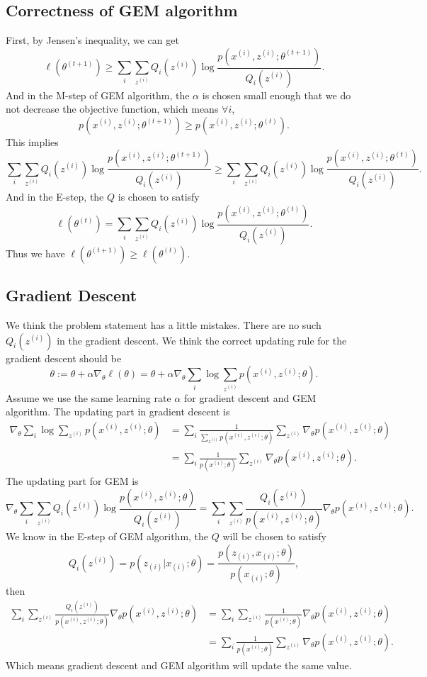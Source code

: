 \documentclass{article}
\begin{document}
\subsection{Correctness of GEM algorithm}
First, by Jensen's inequality, we can get $$\ell(\theta^{(t+1)})\ge\sum_i\sum_{z^{(i)}}Q_i(z^{(i)})\log \frac{p(x^{(i)},z^{(i)};\theta^{(t+1)})}{Q_i(z^{(i)})}.$$ And in the M-step of GEM algorithm, the $\alpha$ is chosen small enough that we do not decrease
the objective function, which means $\forall i$, $$p(x^{(i)},z^{(i)};\theta^{(t+1)}) \ge p(x^{(i)},z^{(i)};\theta^{(t)}).$$ This implies $$\sum_i\sum_{z^{(i)}}Q_i(z^{(i)})\log \frac{p(x^{(i)},z^{(i)};\theta^{(t+1)})}{Q_i(z^{(i)})} \ge \sum_i\sum_{z^{(i)}}Q_i(z^{(i)})\log \frac{p(x^{(i)},z^{(i)};\theta^{(t)})}{Q_i(z^{(i)})}.$$ And in the E-step, the $Q$ is chosen to satisfy $$\ell(\theta^{(t)})=\sum_i\sum_{z^{(i)}}Q_i(z^{(i)})\log \frac{p(x^{(i)},z^{(i)};\theta^{(t)})}{Q_i(z^{(i)})}.$$ Thus we have $\ell(\theta^{(t+1)})\ge\ell(\theta^{(t)})$.

\subsection{Gradient Descent}
We think the problem statement has a little mistakes. There are no such $Q_i(z^{(i)})$ in the gradient descent. We think the correct updating rule for the gradient descent should be $$\theta:=\theta+\alpha\nabla_\theta\ell(\theta) =\theta+\alpha\nabla_\theta\sum_i\log\sum_{z^{(i)}}p(x^{(i)},z^{(i)};\theta).$$
Assume we use the same learning rate $\alpha$ for gradient descent and GEM algorithm. The updating part in gradient descent is
\begin{align*}
\nabla_\theta\sum_i\log\sum_{z^{(i)}}p(x^{(i)},z^{(i)};\theta)&=
\sum_i\frac{1}{\sum_{z^{(i)}}p(x^{(i)},z^{(i)};\theta)} \sum_{z^{(i)}}\nabla_\theta p(x^{(i)},z^{(i)};\theta) \\
&=\sum_i\frac{1}{p(x^{(i)};\theta)}\sum_{z^{(i)}}\nabla_\theta p(x^{(i)},z^{(i)};\theta).
\end{align*}
The updating part for GEM is $$\nabla_\theta\sum_i\sum_{z^{(i)}}Q_i(z^{(i)})\log \frac{p(x^{(i)},z^{(i)};\theta)}{Q_i(z^{(i)})}=
\sum_i\sum_{z^{(i)}}\frac{Q_i(z^{(i)})}{p(x^{(i)},z^{(i)};\theta)} \nabla_\theta p(x^{(i)},z^{(i)};\theta).$$ We know in the E-step of GEM algorithm, the $Q$ will be chosen to satisfy $$Q_i(z^{(i)})=p(z_{(i)}|x_{(i)};\theta)= \frac{p(z_{(i)},x_{(i)};\theta)}{p(x_{(i)};\theta)},$$ then
\begin{align*}
\sum_i\sum_{z^{(i)}}\frac{Q_i(z^{(i)})}{p(x^{(i)},z^{(i)};\theta)} \nabla_\theta p(x^{(i)},z^{(i)};\theta)&=
\sum_i\sum_{z^{(i)}}\frac{1}{p(x^{(i)};\theta)} \nabla_\theta p(x^{(i)},z^{(i)};\theta) \\
&=\sum_i\frac{1}{p(x^{(i)};\theta)}\sum_{z^{(i)}}\nabla_\theta p(x^{(i)},z^{(i)};\theta).
\end{align*}
Which means gradient descent and GEM algorithm will update the same value.
\end{document}
